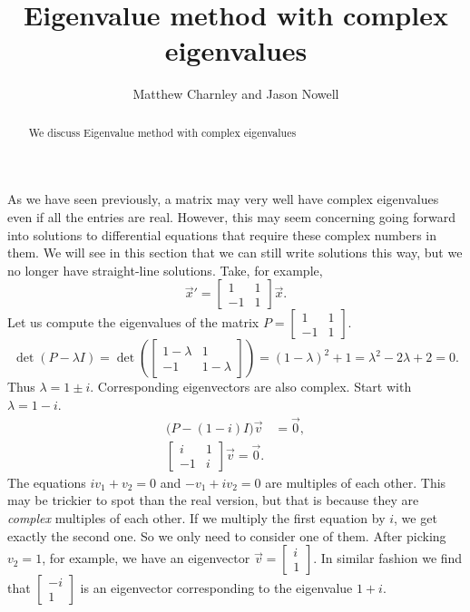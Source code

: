 \documentclass{ximera}
\title{Eigenvalue method with complex eigenvalues}
\author{Matthew Charnley and Jason Nowell}
\begin{document}
\begin{abstract}
    We discuss Eigenvalue method with complex eigenvalues
\end{abstract}
\maketitle


\label{eigenmethod-cplx:section}


As we have seen previously, a matrix may very well have complex eigenvalues even if all the entries are
real. However, this may seem concerning going forward into solutions to differential equations that require these complex numbers in them. We will see in this section that we can still write solutions this way, but we no longer have straight-line solutions.  Take, for example,
\begin{equation*}
    {\vec{x}}' = 
    \begin{bmatrix}
        1 & 1 \\
        -1 & 1
    \end{bmatrix}
    \vec{x} .
\end{equation*}
Let us compute the eigenvalues of the matrix $P = \left[ \begin{smallmatrix} 1 & 1 \\ -1 & 1 \end{smallmatrix} \right]$.
\begin{equation*}
    \det(P - \lambda I) = \det\left(
    \begin{bmatrix}
        1-\lambda & 1 \\
        -1 & 1-\lambda
    \end{bmatrix}
    \right) = {(1-\lambda)}^2 + 1 = \lambda^2 - 2 \lambda + 2 = 0 .
\end{equation*}
Thus $\lambda = 1 \pm i$. Corresponding eigenvectors are also complex. Start with $\lambda = 1-i$.
\begin{align*}
    \bigl(P-(1-i) I\bigr) \vec{v} & = \vec{0} , \\
    \begin{bmatrix}
        i & 1 \\
        -1 & i
    \end{bmatrix}
    \vec{v} = \vec{0}.
\end{align*}
The equations $i v_1 + v_2 = 0$ and $-v_1 + iv_2 = 0$ are multiples of each other. This may be trickier to spot than the real version, but that is because they are \emph{complex} multiples of each other. If we multiply the first equation by $i$, we get exactly the second one. So we only need to consider one of them. After picking $v_2 = 1$, for example, we have an eigenvector $\vec{v} = \left[ \begin{smallmatrix} i \\ 1 \end{smallmatrix} \right]$. In similar fashion we find that $\left[ \begin{smallmatrix} -i \\ 1 \end{smallmatrix} \right]$ is an eigenvector corresponding to the eigenvalue $1+i$.
\end{document}
